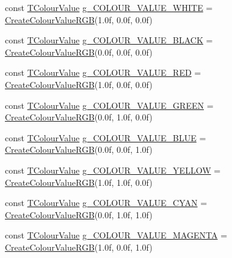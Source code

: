 \begin{DoxyCompactItemize}
\item 
const \hyperlink{struct_slim_1_1_t_colour_value}{T\+Colour\+Value} \hyperlink{namespace_slim_a9c8494b2d8142c2a5348b46f2f84f221}{g\+\_\+\+C\+O\+L\+O\+U\+R\+\_\+\+V\+A\+L\+U\+E\+\_\+\+W\+H\+I\+T\+E} = \hyperlink{namespace_slim_a5d1ac4f7c972e4cbff1739d033eda05b}{Create\+Colour\+Value\+R\+G\+B}(1.\+0f, 0.\+0f, 0.\+0f)
\item 
const \hyperlink{struct_slim_1_1_t_colour_value}{T\+Colour\+Value} \hyperlink{namespace_slim_ae8fc69dad906fd2dda213c5f71c59923}{g\+\_\+\+C\+O\+L\+O\+U\+R\+\_\+\+V\+A\+L\+U\+E\+\_\+\+B\+L\+A\+C\+K} = \hyperlink{namespace_slim_a5d1ac4f7c972e4cbff1739d033eda05b}{Create\+Colour\+Value\+R\+G\+B}(0.\+0f, 0.\+0f, 0.\+0f)
\item 
const \hyperlink{struct_slim_1_1_t_colour_value}{T\+Colour\+Value} \hyperlink{namespace_slim_a41bde6b9797170aa873ca87b475f76ca}{g\+\_\+\+C\+O\+L\+O\+U\+R\+\_\+\+V\+A\+L\+U\+E\+\_\+\+R\+E\+D} = \hyperlink{namespace_slim_a5d1ac4f7c972e4cbff1739d033eda05b}{Create\+Colour\+Value\+R\+G\+B}(1.\+0f, 0.\+0f, 0.\+0f)
\item 
const \hyperlink{struct_slim_1_1_t_colour_value}{T\+Colour\+Value} \hyperlink{namespace_slim_a74ceafe45f27d59e1e7a540771745597}{g\+\_\+\+C\+O\+L\+O\+U\+R\+\_\+\+V\+A\+L\+U\+E\+\_\+\+G\+R\+E\+E\+N} = \hyperlink{namespace_slim_a5d1ac4f7c972e4cbff1739d033eda05b}{Create\+Colour\+Value\+R\+G\+B}(0.\+0f, 1.\+0f, 0.\+0f)
\item 
const \hyperlink{struct_slim_1_1_t_colour_value}{T\+Colour\+Value} \hyperlink{namespace_slim_a583e99a4fe716782182405126b9d97ea}{g\+\_\+\+C\+O\+L\+O\+U\+R\+\_\+\+V\+A\+L\+U\+E\+\_\+\+B\+L\+U\+E} = \hyperlink{namespace_slim_a5d1ac4f7c972e4cbff1739d033eda05b}{Create\+Colour\+Value\+R\+G\+B}(0.\+0f, 0.\+0f, 1.\+0f)
\item 
const \hyperlink{struct_slim_1_1_t_colour_value}{T\+Colour\+Value} \hyperlink{namespace_slim_a8e2fd0c514f1ec5a9986b1573e3c9a74}{g\+\_\+\+C\+O\+L\+O\+U\+R\+\_\+\+V\+A\+L\+U\+E\+\_\+\+Y\+E\+L\+L\+O\+W} = \hyperlink{namespace_slim_a5d1ac4f7c972e4cbff1739d033eda05b}{Create\+Colour\+Value\+R\+G\+B}(1.\+0f, 1.\+0f, 0.\+0f)
\item 
const \hyperlink{struct_slim_1_1_t_colour_value}{T\+Colour\+Value} \hyperlink{namespace_slim_a411f3278744ab504f50bbf0a0991a603}{g\+\_\+\+C\+O\+L\+O\+U\+R\+\_\+\+V\+A\+L\+U\+E\+\_\+\+C\+Y\+A\+N} = \hyperlink{namespace_slim_a5d1ac4f7c972e4cbff1739d033eda05b}{Create\+Colour\+Value\+R\+G\+B}(0.\+0f, 1.\+0f, 1.\+0f)
\item 
const \hyperlink{struct_slim_1_1_t_colour_value}{T\+Colour\+Value} \hyperlink{namespace_slim_a17d9ae16f160ff0d39bd10efc45b47f8}{g\+\_\+\+C\+O\+L\+O\+U\+R\+\_\+\+V\+A\+L\+U\+E\+\_\+\+M\+A\+G\+E\+N\+T\+A} = \hyperlink{namespace_slim_a5d1ac4f7c972e4cbff1739d033eda05b}{Create\+Colour\+Value\+R\+G\+B}(1.\+0f, 0.\+0f, 1.\+0f)

\end{DoxyCompactItemize}
